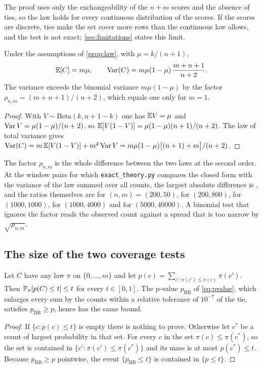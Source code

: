 The proof uses only the exchangeability of the $n+m$ scores and the absence of ties, so the law holds for every continuous distribution of the scores. If the scores are discrete, ties make the set cover more rows than the continuous law allows, and the test is not exact; \cref{sec:limitations} states this limit.

\begin{proposition}
\label{prop:variance}
Under the assumptions of \cref{prop:law}, with $\mu=k/(n+1)$,
\[
\mathbb{E}[C]=m\mu,\qquad \operatorname{Var}(C)=m\mu(1-\mu)\,\frac{m+n+1}{n+2}.
\]
The variance exceeds the binomial variance $m\mu(1-\mu)$ by the factor $\rho_{n,m}=(m+n+1)/(n+2)$, which equals one only for $m=1$.
\end{proposition}
\begin{proof}
With $V\sim\mathrm{Beta}(k,n+1-k)$ one has $\mathbb{E} V=\mu$ and $\operatorname{Var} V=\mu(1-\mu)/(n+2)$, so $\mathbb{E}[V(1-V)]=\mu(1-\mu)(n+1)/(n+2)$. The law of total variance gives $\operatorname{Var}(C)=m\,\mathbb{E}[V(1-V)]+m^2\operatorname{Var} V=m\mu(1-\mu)\bigl[(n+1)+m\bigr]/(n+2)$.
\end{proof}

The factor $\rho_{n,m}$ is the whole difference between the two laws at the second order. At the \VarRatioPairs{} window pairs for which \texttt{exact\_theory.py} compares the closed form with the variance of the law summed over all counts, the largest absolute difference is \VarRatioMaxErr{}, and the ratios themselves are \VarRatioA{} for $(n,m)=(200,50)$, \VarRatioB{} for $(200,800)$, \VarRatioC{} for $(1000,1000)$, \VarRatioD{} for $(1000,4000)$ and \VarRatioE{} for $(5000,40000)$. A binomial test that ignores the factor reads the observed count against a spread that is too narrow by $\sqrt{\rho_{n,m}}$.

\subsection{The size of the two coverage tests}

\begin{proposition}
\label{prop:validity}
Let $C$ have any law $\pi$ on $\{0,\dots,m\}$ and let $p(c)=\sum_{c':\pi(c')\le\pi(c)}\pi(c')$. Then $\mathbb{P}_\pi[p(C)\le t]\le t$ for every $t\in[0,1]$. The p-value $p_{\mathrm{BB}}$ of \cref{eq:pvalue}, which enlarges every sum by the counts within a relative tolerance of $10^{-7}$ of the tie, satisfies $p_{\mathrm{BB}}\ge p$, hence has the same bound.
\end{proposition}
\begin{proof}
If $\{c:p(c)\le t\}$ is empty there is nothing to prove. Otherwise let $c^\ast$ be a count of largest probability in that set. For every $c$ in the set $\pi(c)\le\pi(c^\ast)$, so the set is contained in $\{c':\pi(c')\le\pi(c^\ast)\}$ and its mass is at most $p(c^\ast)\le t$. Because $p_{\mathrm{BB}}\ge p$ pointwise, the event $\{p_{\mathrm{BB}}\le t\}$ is contained in $\{p\le t\}$.
\end{proof}

